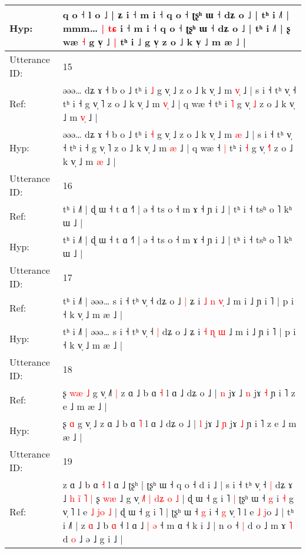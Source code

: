 \documentclass[10pt]{article}
\DeclareRobustCommand{\hl}[1]{{\textcolor{red}{#1}}}
\begin{document}
\begin{longtable}{ll}
 \\
Hyp: & q o ˧ l o ˩ | ʑ i ˧ m i ˧ q o ˧\hl{}\hl{} ʈʂʰ ɯ ˧ dʑ o ˩ | tʰ i ˩˥ | mmm…\hl{ }\hl{|} \hl{t}\hl{ɕ} i ˧ m i ˧ q o ˧\hl{}\hl{} ʈʂʰ ɯ ˧ dʑ o ˩ | tʰ i ˩˥ | ʂ wæ \hl{˧} g v̩ ˩\hl{ }\hl{|} tʰ i ˩ g v̩\hl{}\hl{} z o ˩ k v̩ ˩ m æ ˩ |
 \\
\midrule
Utterance ID: & 15 \\
Ref: & əəə… dʑ ɤ ˧ b o ˩ tʰ i \hl{˩} g v̩ ˩ z o ˩ k v̩ ˩ m \hl{v}\hl{̩} ˩ | s i ˧ tʰ v̩ ˧ tʰ i ˧ g v̩ ˥ z o ˩ k v̩ ˩ m \hl{v}\hl{̩} ˩ | q wæ ˧\hl{}\hl{} tʰ i \hl{˥} g v̩ \hl{}\hl{˩} z o ˩ k v̩ ˩ m \hl{v}\hl{̩} ˩ |
 \\
Hyp: & əəə… dʑ ɤ ˧ b o ˩ tʰ i \hl{˧} g v̩ ˩ z o ˩ k v̩ ˩ m \hl{}\hl{æ} ˩ | s i ˧ tʰ v̩ ˧ tʰ i ˧ g v̩ ˥ z o ˩ k v̩ ˩ m \hl{}\hl{æ} ˩ | q wæ ˧\hl{ }\hl{|} tʰ i \hl{˧} g v̩ \hl{˧}\hl{˥} z o ˩ k v̩ ˩ m \hl{}\hl{æ} ˩ |
 \\
\midrule
Utterance ID: & 16 \\
Ref: & tʰ i ˩˥ | ɖ ɯ ˧ t ɑ ˧˥ | ə ˧ ts o ˧ m ɤ ˧ ɲ i ˩ | tʰ i ˧ tsʰ o ˥ kʰ ɯ ˩ |
 \\
Hyp: & tʰ i ˩˥ | ɖ ɯ ˧ t ɑ ˧˥ | ə ˧ ts o ˧ m ɤ ˧ ɲ i ˩ | tʰ i ˧ tsʰ o ˥ kʰ ɯ ˩ |
 \\
\midrule
Utterance ID: & 17 \\
Ref: & tʰ i ˩˥ | əəə… s i ˧ tʰ v̩ ˧\hl{}\hl{} dʑ o ˩\hl{ }\hl{|} ʑ i \hl{˩} \hl{n} \hl{v}\hl{̩} ˩ m i ˩ ɲ i ˥ | p i ˧ k v̩ ˩ m æ ˩ |
 \\
Hyp: & tʰ i ˩˥ | əəə… s i ˧ tʰ v̩ ˧\hl{ }\hl{|} dʑ o ˩\hl{}\hl{} ʑ i \hl{˧} \hl{ɳ} \hl{}\hl{ɯ} ˩ m i ˩ ɲ i ˥ | p i ˧ k v̩ ˩ m æ ˩ |
 \\
\midrule
Utterance ID: & 18 \\
Ref: & ʂ\hl{ }\hl{w}\hl{æ} \hl{˩} g v̩ ˩\hl{˥}\hl{ }\hl{|} z ɑ ˩ b ɑ \hl{˧} l ɑ ˩ dʑ o ˩ | \hl{n} jɤ ˩ \hl{n} jɤ \hl{˧} ɲ i ˥ z e ˩ m æ ˩ |
 \\
Hyp: & ʂ\hl{}\hl{}\hl{} \hl{ɑ} g v̩ ˩\hl{}\hl{}\hl{} z ɑ ˩ b ɑ \hl{˥} l ɑ ˩ dʑ o ˩ | \hl{l} jɤ ˩ \hl{ɲ} jɤ \hl{˩} ɲ i ˥ z e ˩ m æ ˩ |
 \\
\midrule
Utterance ID: & 19 \\
Ref: & z ɑ ˩\hl{}\hl{} b ɑ \hl{˧} l ɑ ˩ ʈʂʰ\hl{}\hl{} | ʈʂʰ ɯ ˧ q o ˧ d i ˩ | s i ˧ t\hl{}ʰ v̩ ˧\hl{ }\hl{|} dʑ ɤ ˩\hl{ }\hl{h}\hl{ }\hl{i}\hl{̃}\hl{ }\hl{˥}\hl{ }\hl{|} ʂ \hl{w}\hl{æ} ˩ g v̩ \hl{˩}˥\hl{ }\hl{|}\hl{ }\hl{d}\hl{ʑ}\hl{ }\hl{o}\hl{ }\hl{˩} | ɖ ɯ ˧ g i ˥\hl{ }\hl{|} ʈʂʰ ɯ ˧ \hl{}\hl{g} i \hl{˧} g v̩ ˥\hl{}\hl{} l e \hl{˩} \hl{}\hl{j}\hl{o} \hl{˩} | ɖ ɯ ˧ g i ˥ | ʈʂʰ ɯ ˧ \hl{g} i ˧ \hl{g} v̩ ˥ l e \hl{˩} \hl{}\hl{}\hl{j}o ˩ | tʰ i ˩˥ | z \hl{ɑ} ˩\hl{}\hl{} b \hl{}\hl{ɑ} ˧ l ɑ ˩ \hl{|} \hl{ə} ˧ m ɑ ˧ k i ˩ | n o ˧\hl{ }\hl{|} d o ˩ m ɤ \hl{˥} d \hl{o} ˩\hl{}\hl{} ə ˩ g i ˩ |

\end{longtable}
\end{document}
